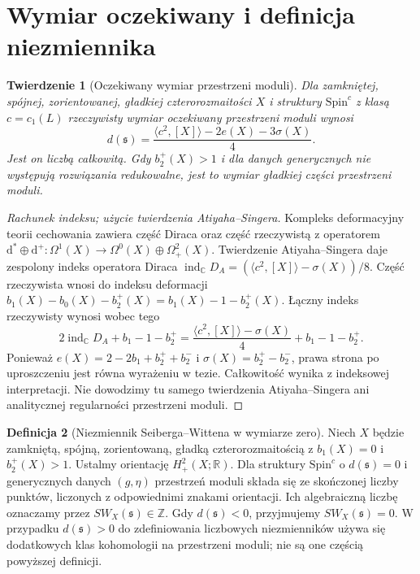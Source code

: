 \documentclass[11pt,a4paper]{report}
\numberwithin{equation}{section}
\theoremstyle{plain}
\newtheorem{twierdzenie}{Twierdzenie}[section]
\theoremstyle{definition}
\newtheorem{definicja}[twierdzenie]{Definicja}
\theoremstyle{remark}
\begin{document}
\section{Wymiar oczekiwany i definicja niezmiennika}
\label{sec:tg-sw-dimension}

\begin{twierdzenie}[Oczekiwany wymiar przestrzeni moduli]
\label{thm:tg-sw-dimension}
Dla zamkniętej, spójnej, zorientowanej,
gładkiej czterorozmaitości $X$ i struktury
$\mathrm{Spin}^c$ z klasą $c=c_1(L)$ rzeczywisty
wymiar oczekiwany przestrzeni moduli wynosi
\[
d(\mathfrak s)=\frac{\langle c^2,[X]\rangle-2e(X)-3\sigma(X)}4.
\]
Jest on liczbą całkowitą. Gdy $b_2^+(X)>1$ i dla danych
generycznych nie występują rozwiązania redukowalne,
jest to wymiar gładkiej części przestrzeni moduli.
\end{twierdzenie}

\begin{proof}[Rachunek indeksu; użycie twierdzenia Atiyaha--Singera]
Kompleks deformacyjny teorii cechowania zawiera część
Diraca oraz część rzeczywistą z operatorem
$\mathrm d^*\oplus\mathrm d^+:\Omega^1(X)\to
\Omega^0(X)\oplus\Omega^2_+(X)$.
Twierdzenie Atiyaha--Singera daje zespolony indeks operatora
Diraca $\operatorname{ind}_{\mathbb C}D_A
=(\langle c^2,[X]\rangle-\sigma(X))/8$.
Część rzeczywista wnosi do indeksu deformacji
$b_1(X)-b_0(X)-b_2^+(X)=b_1(X)-1-b_2^+(X)$.
Łączny indeks rzeczywisty wynosi wobec tego
\[
2\operatorname{ind}_{\mathbb C}D_A+b_1-1-b_2^+
=\frac{\langle c^2,[X]\rangle-\sigma(X)}4+b_1-1-b_2^+.
\]
Ponieważ $e(X)=2-2b_1+b_2^++b_2^-$ i
$\sigma(X)=b_2^+-b_2^-$, prawa strona po uproszczeniu
jest równa wyrażeniu w tezie.
Całkowitość wynika z indeksowej interpretacji.
Nie dowodzimy tu samego twierdzenia Atiyaha--Singera ani
analitycznej regularności przestrzeni moduli.
\end{proof}

\begin{definicja}[Niezmiennik Seiberga--Wittena w wymiarze zero]
Niech $X$ będzie zamkniętą, spójną, zorientowaną,
gładką czterorozmaitością z $b_1(X)=0$ i $b_2^+(X)>1$.
Ustalmy orientację $H^2_+(X;\mathbb R)$.
Dla struktury $\mathrm{Spin}^c$ o $d(\mathfrak s)=0$
i generycznych danych $(g,\eta)$ przestrzeń moduli
składa się ze skończonej liczby punktów, liczonych
z odpowiednimi znakami orientacji. Ich algebraiczną
liczbę oznaczamy przez $SW_X(\mathfrak s)\in\mathbb Z$.
Gdy $d(\mathfrak s)<0$, przyjmujemy $SW_X(\mathfrak s)=0$.
W przypadku $d(\mathfrak s)>0$ do zdefiniowania
liczbowych niezmienników używa się dodatkowych klas
kohomologii na przestrzeni moduli; nie są one częścią
powyższej definicji.
\end{definicja}
\end{document}
